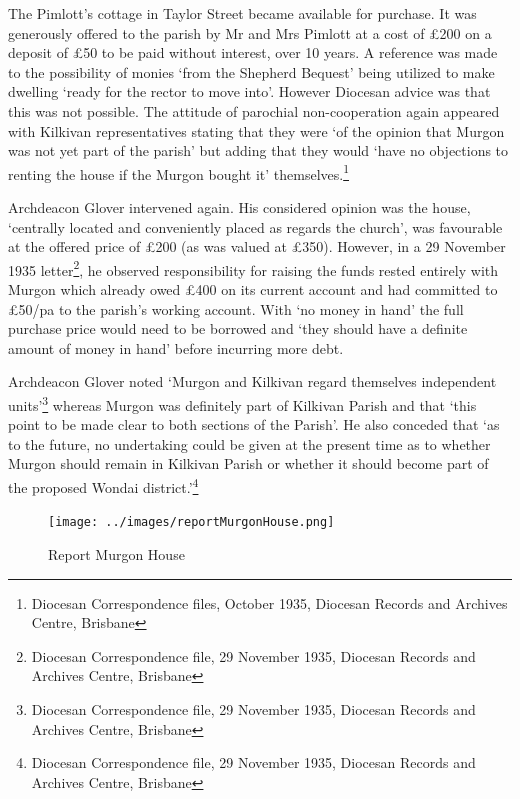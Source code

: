 The Pimlott's cottage in Taylor Street became available for purchase. It was generously offered to the parish by Mr and Mrs Pimlott at a cost of \pounds200 on a deposit of \pounds50 to be paid without interest, over 10 years. A reference was made to the possibility of monies `from the Shepherd Bequest' being utilized to make dwelling `ready for the rector to move into'. However Diocesan advice was that this was not possible. The attitude of parochial non-cooperation again appeared with Kilkivan representatives stating that they were `of the opinion that Murgon was not yet part of the parish' but adding that they would `have no objections to renting the house if the Murgon bought it' themselves.\footnote{Diocesan Correspondence files, October 1935, Diocesan Records and Archives Centre, Brisbane}


Archdeacon Glover intervened again. His considered opinion was the house, `centrally located and conveniently placed as regards the church', was favourable at the offered price of \pounds200 (as was valued at \pounds350). However, in a 29 November 1935 letter\footnote{Diocesan Correspondence file, 29 November 1935, Diocesan Records and Archives Centre, Brisbane}, he observed responsibility for raising the funds rested entirely with Murgon which already owed \pounds400 on its current account and had committed to \pounds50/pa to the parish's working account. With `no money in hand' the full purchase price would need to be borrowed and `they should have a definite amount of money in hand' before incurring more debt.


Archdeacon Glover noted `Murgon and Kilkivan regard themselves independent units'\footnote{Diocesan Correspondence file, 29 November 1935, Diocesan Records and Archives Centre, Brisbane} whereas Murgon was definitely part of Kilkivan Parish and that `this point to be made clear to both sections of the Parish'. He also conceded that `as to the future, no undertaking could be given at the present time as to whether Murgon should remain in Kilkivan Parish or whether it should become part of the proposed Wondai district.'\footnote{Diocesan Correspondence file, 29 November 1935, Diocesan Records and Archives Centre, Brisbane}








\begin{figure}
\begin{center}
\texttt{[image: ../images/reportMurgonHouse.png]}
\caption{Report Murgon House}
\end{center}
\end{figure}




